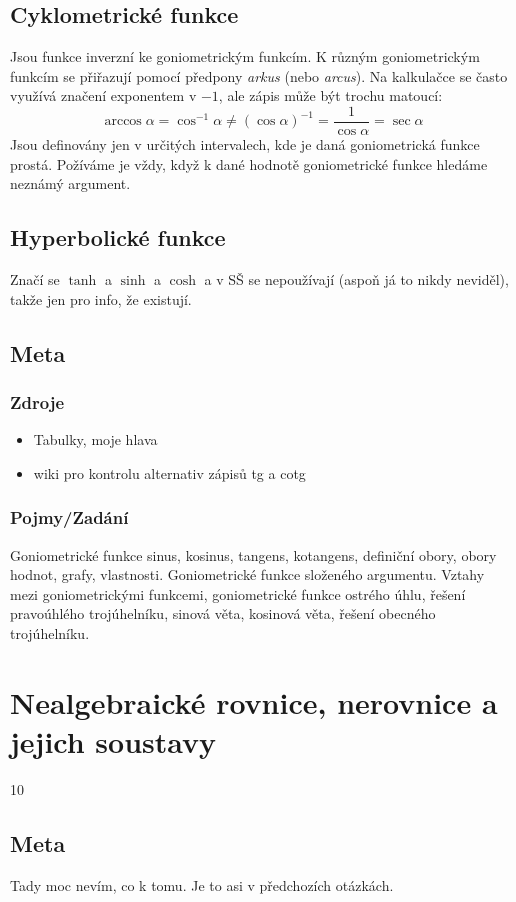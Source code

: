 \documentclass[12pt]{article}
\begin{document}
\subsection{Cyklometrické funkce}
Jsou funkce inverzní ke goniometrickým funkcím. K různým goniometrickým funkcím se přiřazují pomocí předpony \emph{arkus} (nebo \emph{arcus}). Na kalkulačce se často využívá značení exponentem v $-1$, ale zápis může být trochu matoucí:
\begin{equation}
\arccos \alpha = \cos^{-1} \alpha \neq ( \cos \alpha )^{-1} = \frac{1}{\cos \alpha} = \sec \alpha
\end{equation}
Jsou definovány jen v určitých intervalech, kde je daná goniometrická funkce prostá. Požíváme je vždy, když k dané hodnotě goniometrické funkce hledáme neznámý argument.
\subsection{Hyperbolické funkce}
Značí se $\tanh$ a $\sinh$ a $\cosh$ a v SŠ se nepoužívají (aspoň já to nikdy neviděl), takže jen pro info, že existují.
\subsection{Meta}
\subsubsection{Zdroje}
\begin{itemize}
\item Tabulky, moje hlava
\item wiki pro kontrolu alternativ zápisů tg a cotg
\end{itemize}
\subsubsection{Pojmy/Zadání}
Goniometrické funkce sinus, kosinus, tangens, kotangens, definiční obory, obory hodnot, grafy, vlastnosti. Goniometrické funkce složeného argumentu. Vztahy mezi goniometrickými funkcemi, goniometrické funkce ostrého úhlu, řešení pravoúhlého trojúhelníku, sinová věta, kosinová věta, řešení obecného trojúhelníku.
\section{Nealgebraické rovnice, nerovnice a jejich soustavy}
10
\subsection{Meta}
Tady moc nevím, co k tomu. Je to asi v předchozích otázkách.
\end{document}
